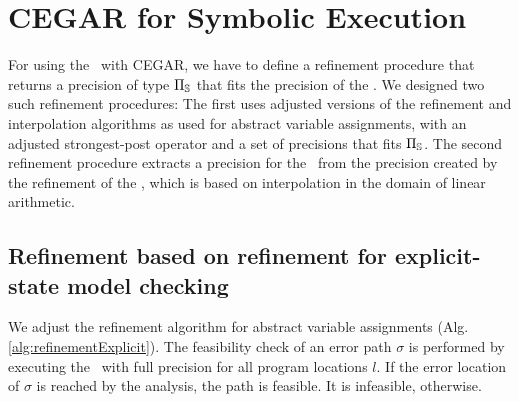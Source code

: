 \section{CEGAR for Symbolic Execution}
For using the \symbolicExecutionCPA\ with CEGAR, we have to define a refinement procedure that returns a precision of type $\Pi_{\mathbb{S}}$ that fits the precision of the \symbolicExecutionCPA. We designed two such refinement procedures:
The first uses adjusted versions of the refinement and interpolation algorithms as used for abstract variable assignments,
with an adjusted strongest-post operator and a set of precisions that fits $\Pi_{\mathbb{S}}$.
The second refinement procedure extracts a precision for the \symbolicExecutionCPA\ from the precision created by the refinement of the \predicateCPA, which is based on interpolation in the domain of linear arithmetic.

\subsection{Refinement based on refinement for explicit-state model checking}
\label{sec:assignmentRefinement}
We adjust the refinement algorithm for abstract variable assignments (Alg. \ref{alg:refinementExplicit}).
The feasibility check of an error path $\sigma$ is performed by executing the \symbolicExecutionCPA\ with full precision for all program locations $l$.
If the error location of $\sigma$ is reached by the analysis, the path is feasible. It is infeasible, otherwise.

